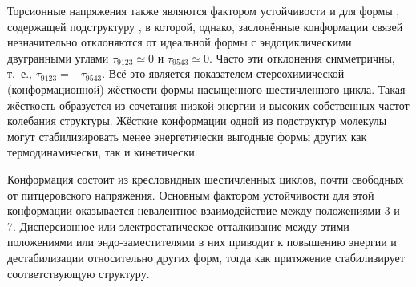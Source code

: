 Торсионные напряжения также являются фактором устойчивости и для формы \CB{}, содержащей подструктуру , в которой, однако, заслонённые конформации связей незначительно отклоняются от идеальной формы  с эндоциклическими двугранными углами $\tau_{9123}\simeq 0$ и $\tau_{9543}\simeq 0$. Часто эти отклонения симметричны, т. е., $\tau_{9123} = -\tau_{9543}$. Всё это является показателем стереохимической (конформационной) жёсткости формы  насыщенного шестичленного цикла. Такая жёсткость образуется из сочетания низкой энергии и высоких собственных частот колебания структуры. Жёсткие конформации одной из подструктур молекулы могут стабилизировать менее энергетически выгодные формы других как термодинамически, так и  кинетически.

Конформация \CC{} состоит из кресловидных шестичленных циклов, почти свободных от питцеровского напряжения. Основным фактором устойчивости для этой конформации оказывается невалентное взаимодействие между положениями 3 и 7. Дисперсионное или электростатическое отталкивание между этими положениями или эндо-заместителями в них приводит к повышению энергии и дестабилизации \CC{} относительно других форм, тогда как притяжение стабилизирует соответствующую структуру.
